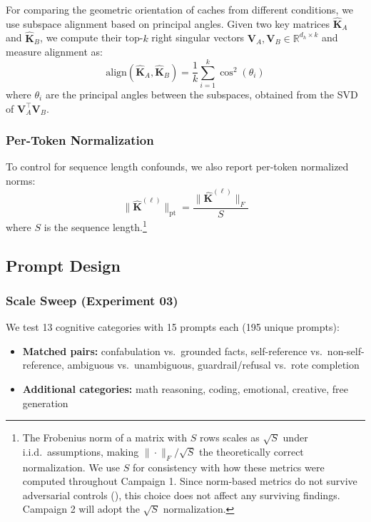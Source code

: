 \documentclass[11pt,a4paper]{article}
\begin{document}
For comparing the geometric orientation of caches from different conditions, we use subspace alignment based on principal angles. Given two key matrices $\hat{\mathbf{K}}_A$ and $\hat{\mathbf{K}}_B$, we compute their top-$k$ right singular vectors $\mathbf{V}_A, \mathbf{V}_B \in \mathbb{R}^{d_h \times k}$ and measure alignment as:
\begin{equation}
    \text{align}(\hat{\mathbf{K}}_A, \hat{\mathbf{K}}_B) = \frac{1}{k} \sum_{i=1}^{k} \cos^2(\theta_i)
\end{equation}
where $\theta_i$ are the principal angles between the subspaces, obtained from the SVD of $\mathbf{V}_A^\top \mathbf{V}_B$.

\subsubsection{Per-Token Normalization}

To control for sequence length confounds, we also report per-token normalized norms:
\begin{equation}
    \|\hat{\mathbf{K}}^{(\ell)}\|_{\text{pt}} = \frac{\|\hat{\mathbf{K}}^{(\ell)}\|_F}{S}
\end{equation}
where $S$ is the sequence length.\footnote{The Frobenius norm of a matrix with $S$ rows scales as $\sqrt{S}$ under i.i.d.\ assumptions, making $\|\cdot\|_F / \sqrt{S}$ the theoretically correct normalization. We use $S$ for consistency with how these metrics were computed throughout Campaign 1. Since norm-based metrics do not survive adversarial controls (), this choice does not affect any surviving findings. Campaign 2 will adopt the $\sqrt{S}$ normalization.}

\subsection{Prompt Design}

\subsubsection{Scale Sweep (Experiment 03)}

We test 13 cognitive categories with 15 prompts each (195 unique prompts):

\begin{itemize}[leftmargin=*]
    \item \textbf{Matched pairs:} confabulation vs.\ grounded facts, self-reference vs.\ non-self-reference, ambiguous vs.\ unambiguous, guardrail/refusal vs.\ rote completion
    \item \textbf{Additional categories:} math reasoning, coding, emotional, creative, free generation
\end{itemize}
\end{document}
